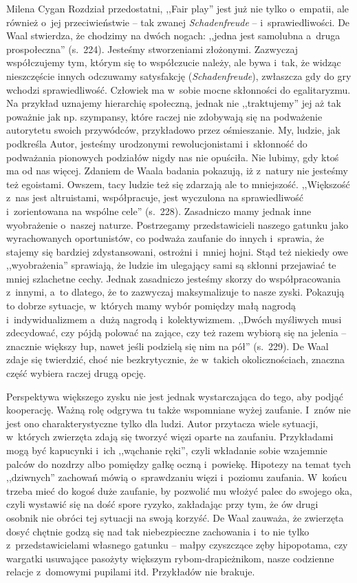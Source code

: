 \begin{recplenv}{Milena Cygan}
Rozdział przedostatni, ,,Fair play'' jest już nie tylko o~empatii, ale również o~jej przeciwieństwie -- tak zwanej
\textit{Schadenfreude} -- i~sprawiedliwości. De Waal stwierdza, że chodzimy na dwóch nogach: ,,jedna jest
samolubna a~druga prospołeczna'' (s.~224). Jesteśmy stworzeniami złożonymi. Zazwyczaj współczujemy tym, którym się to współczucie
należy, ale bywa i~tak, że widząc nieszczęście innych odczuwamy satysfakcję (\textit{Schadenfreude}), zwłaszcza gdy do
gry wchodzi sprawiedliwość. Człowiek ma w~sobie mocne skłonności do egalitaryzmu. Na przykład uznajemy hierarchię
społeczną, jednak nie ,,traktujemy'' jej aż tak poważnie jak np. szympansy, które raczej nie zdobywają się na podważenie
autorytetu swoich przywódców, przykładowo przez ośmieszanie. My, ludzie, jak podkreśla Autor, jesteśmy urodzonymi
rewolucjonistami i~skłonność do podważania pionowych podziałów nigdy nas nie opuściła. Nie lubimy, gdy ktoś ma od nas
więcej. Zdaniem de Waala badania pokazują, iż z~natury nie jesteśmy też egoistami. Owszem, tacy ludzie też się zdarzają
ale to mniejszość. ,,Większość z~nas jest altruistami, współpracuje, jest wyczulona na sprawiedliwość i~zorientowana na
wspólne cele'' (s.~228). Zasadniczo mamy jednak inne wyobrażenie o~naszej naturze. Postrzegamy przedstawicieli naszego
gatunku jako wyrachowanych oportunistów, co podważa zaufanie do innych i~sprawia, że stajemy się bardziej
zdystansowani, ostrożni i~mniej hojni. Stąd też niekiedy owe ,,wyobrażenia'' sprawiają, że ludzie im ulegający sami są
skłonni przejawiać te mniej szlachetne cechy. Jednak zasadniczo jesteśmy skorzy do współpracowania z~innymi, a~to
dlatego, że to zazwyczaj maksymalizuje to nasze zyski. Pokazują to dobrze sytuacje, w~których mamy wybór pomiędzy małą
nagrodą i~indywidualizmem a~dużą nagrodą i~kolektywizmem. ,,Dwóch myśliwych musi zdecydować, czy pójdą polować na
zające, czy też razem wybiorą się na jelenia -- znacznie większy łup, nawet jeśli podzielą się nim na pół'' (s.~229). De
Waal zdaje się twierdzić, choć nie bezkrytycznie, że w~takich okolicznościach, znaczna część wybiera raczej drugą
opcję.

\enlargethispage{-.5\baselineskip}

Perspektywa większego zysku nie jest jednak wystarczająca do tego, aby podjąć kooperację. Ważną rolę odgrywa tu także
wspomniane wyżej zaufanie. I~znów nie jest ono charakterystyczne tylko dla ludzi. Autor przytacza wiele
sytuacji, w~których zwierzęta zdają się tworzyć więzi oparte na zaufaniu. Przykładami mogą być kapucynki i~ich ,,wąchanie ręki'',
czyli wkładanie sobie wzajemnie palców do nozdrzy albo pomiędzy gałkę oczną i~powiekę. Hipotezy na temat tych
,,dziwnych'' zachowań mówią o~sprawdzaniu więzi i~poziomu zaufania. W~końcu trzeba mieć do kogoś duże zaufanie, by
pozwolić mu włożyć palec do swojego oka, czyli wystawić się na dość spore ryzyko, zakładając przy tym, że ów drugi
osobnik nie obróci tej sytuacji na swoją korzyść. De Waal zauważa, że zwierzęta dosyć chętnie godzą się nad tak
niebezpieczne zachowania i~to nie tylko z~przedstawicielami własnego gatunku -- małpy czyszczące zęby hipopotama, czy
wargatki usuwające pasożyty większym rybom-drapieżnikom, nasze codzienne relacje z~domowymi pupilami itd. Przykładów
nie brakuje. 


\end{recplenv}

